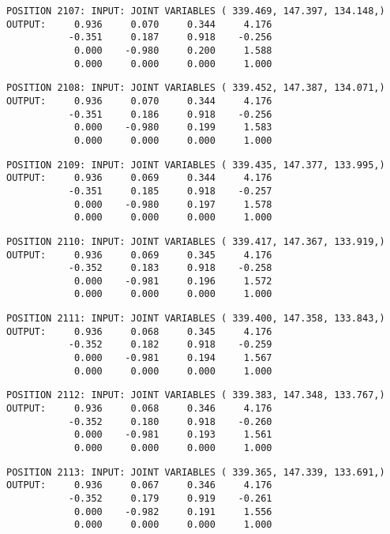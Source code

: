 \begin{verbatim}
POSITION 2107: INPUT: JOINT VARIABLES ( 339.469, 147.397, 134.148,)
OUTPUT:     0.936     0.070     0.344     4.176
           -0.351     0.187     0.918    -0.256
            0.000    -0.980     0.200     1.588
            0.000     0.000     0.000     1.000
\end{verbatim} \pagebreak[1]\begin{verbatim}
POSITION 2108: INPUT: JOINT VARIABLES ( 339.452, 147.387, 134.071,)
OUTPUT:     0.936     0.070     0.344     4.176
           -0.351     0.186     0.918    -0.256
            0.000    -0.980     0.199     1.583
            0.000     0.000     0.000     1.000
\end{verbatim} \pagebreak[1]\begin{verbatim}
POSITION 2109: INPUT: JOINT VARIABLES ( 339.435, 147.377, 133.995,)
OUTPUT:     0.936     0.069     0.344     4.176
           -0.351     0.185     0.918    -0.257
            0.000    -0.980     0.197     1.578
            0.000     0.000     0.000     1.000
\end{verbatim} \pagebreak[1]\begin{verbatim}
POSITION 2110: INPUT: JOINT VARIABLES ( 339.417, 147.367, 133.919,)
OUTPUT:     0.936     0.069     0.345     4.176
           -0.352     0.183     0.918    -0.258
            0.000    -0.981     0.196     1.572
            0.000     0.000     0.000     1.000
\end{verbatim} \pagebreak[1]\begin{verbatim}
POSITION 2111: INPUT: JOINT VARIABLES ( 339.400, 147.358, 133.843,)
OUTPUT:     0.936     0.068     0.345     4.176
           -0.352     0.182     0.918    -0.259
            0.000    -0.981     0.194     1.567
            0.000     0.000     0.000     1.000
\end{verbatim} \pagebreak[1]\begin{verbatim}
POSITION 2112: INPUT: JOINT VARIABLES ( 339.383, 147.348, 133.767,)
OUTPUT:     0.936     0.068     0.346     4.176
           -0.352     0.180     0.918    -0.260
            0.000    -0.981     0.193     1.561
            0.000     0.000     0.000     1.000
\end{verbatim} \pagebreak[1]\begin{verbatim}
POSITION 2113: INPUT: JOINT VARIABLES ( 339.365, 147.339, 133.691,)
OUTPUT:     0.936     0.067     0.346     4.176
           -0.352     0.179     0.919    -0.261
            0.000    -0.982     0.191     1.556
            0.000     0.000     0.000     1.000
\end{verbatim} \pagebreak[1]\begin{verbatim}

\end{verbatim}
